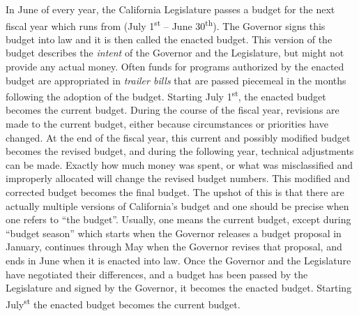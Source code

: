 In June of every year, the California Legislature passes a budget for the next fiscal year which runs from (July 1\textsuperscript{st} – June 30\textsuperscript{th}). The Governor signs this budget into law and it is then called the enacted budget. This version of the budget describes the \textit{intent} of the Governor and the Legislature, but might not provide any actual money. Often funds for programs authorized by the enacted budget are appropriated in \textit{trailer bills} that are passed piecemeal in the months following the adoption of the budget. Starting July 1\textsuperscript{st}, the enacted budget becomes the current budget. During the course of the fiscal year, revisions are made to the current budget, either because circumstances or priorities have changed. At the end of the fiscal year, this current and possibly modified budget becomes the revised budget, and during the following year, technical adjustments can be made. Exactly how much money was spent, or what was misclassified and improperly allocated will change the revised budget numbers. This modified and corrected budget becomes the final budget. The upshot of this is that there are actually multiple versions of California's budget and one should be precise when one refers to ``the budget''. Usually, one means the current budget, except during ``budget season'' which starts when the Governor releases a budget proposal in January, continues through May when the Governor revises that proposal, and ends in June when it is enacted into law. Once the Governor and the Legislature have negotiated their differences, and a budget has been passed by the Legislature and signed by the Governor, it becomes the enacted budget. Starting July\textsuperscript{st} the enacted budget becomes the current budget.

